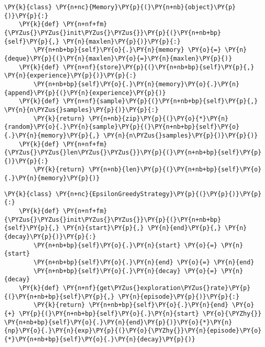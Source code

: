     \begin{tcolorbox}[breakable, size=fbox, boxrule=1pt, pad at break*=1mm,colback=cellbackground, colframe=cellborder]
\begin{Verbatim}[commandchars=\\\{\}]
\PY{k}{class} \PY{n+nc}{Memory}\PY{p}{(}\PY{n+nb}{object}\PY{p}{)}\PY{p}{:}
    \PY{k}{def} \PY{n+nf+fm}{\PYZus{}\PYZus{}init\PYZus{}\PYZus{}}\PY{p}{(}\PY{n+nb+bp}{self}\PY{p}{,} \PY{n}{maxlen}\PY{p}{)}\PY{p}{:}
        \PY{n+nb+bp}{self}\PY{o}{.}\PY{n}{memory} \PY{o}{=} \PY{n}{deque}\PY{p}{(}\PY{n}{maxlen}\PY{o}{=}\PY{n}{maxlen}\PY{p}{)}
    \PY{k}{def} \PY{n+nf}{store}\PY{p}{(}\PY{n+nb+bp}{self}\PY{p}{,} \PY{n}{experience}\PY{p}{)}\PY{p}{:}
        \PY{n+nb+bp}{self}\PY{o}{.}\PY{n}{memory}\PY{o}{.}\PY{n}{append}\PY{p}{(}\PY{n}{experience}\PY{p}{)}
    \PY{k}{def} \PY{n+nf}{sample}\PY{p}{(}\PY{n+nb+bp}{self}\PY{p}{,} \PY{n}{n\PYZus{}samples}\PY{p}{)}\PY{p}{:}
        \PY{k}{return} \PY{n+nb}{zip}\PY{p}{(}\PY{o}{*}\PY{n}{random}\PY{o}{.}\PY{n}{sample}\PY{p}{(}\PY{n+nb+bp}{self}\PY{o}{.}\PY{n}{memory}\PY{p}{,} \PY{n}{n\PYZus{}samples}\PY{p}{)}\PY{p}{)}
    \PY{k}{def} \PY{n+nf+fm}{\PYZus{}\PYZus{}len\PYZus{}\PYZus{}}\PY{p}{(}\PY{n+nb+bp}{self}\PY{p}{)}\PY{p}{:}
        \PY{k}{return} \PY{n+nb}{len}\PY{p}{(}\PY{n+nb+bp}{self}\PY{o}{.}\PY{n}{memory}\PY{p}{)}
\end{Verbatim}
\end{tcolorbox}

    \begin{tcolorbox}[breakable, size=fbox, boxrule=1pt, pad at break*=1mm,colback=cellbackground, colframe=cellborder]
\begin{Verbatim}[commandchars=\\\{\}]
\PY{k}{class} \PY{n+nc}{EpsilonGreedyStrategy}\PY{p}{(}\PY{p}{)}\PY{p}{:}
    \PY{k}{def} \PY{n+nf+fm}{\PYZus{}\PYZus{}init\PYZus{}\PYZus{}}\PY{p}{(}\PY{n+nb+bp}{self}\PY{p}{,} \PY{n}{start}\PY{p}{,} \PY{n}{end}\PY{p}{,} \PY{n}{decay}\PY{p}{)}\PY{p}{:}
        \PY{n+nb+bp}{self}\PY{o}{.}\PY{n}{start} \PY{o}{=} \PY{n}{start}
        \PY{n+nb+bp}{self}\PY{o}{.}\PY{n}{end} \PY{o}{=} \PY{n}{end}
        \PY{n+nb+bp}{self}\PY{o}{.}\PY{n}{decay} \PY{o}{=} \PY{n}{decay}
    \PY{k}{def} \PY{n+nf}{get\PYZus{}exploration\PYZus{}rate}\PY{p}{(}\PY{n+nb+bp}{self}\PY{p}{,} \PY{n}{episode}\PY{p}{)}\PY{p}{:}
        \PY{k}{return} \PY{n+nb+bp}{self}\PY{o}{.}\PY{n}{end} \PY{o}{+} \PY{p}{(}\PY{n+nb+bp}{self}\PY{o}{.}\PY{n}{start} \PY{o}{\PYZhy{}} \PY{n+nb+bp}{self}\PY{o}{.}\PY{n}{end}\PY{p}{)}\PY{o}{*}\PY{n}{np}\PY{o}{.}\PY{n}{exp}\PY{p}{(}\PY{o}{\PYZhy{}}\PY{n}{episode}\PY{o}{*}\PY{n+nb+bp}{self}\PY{o}{.}\PY{n}{decay}\PY{p}{)}
\end{Verbatim}
\end{tcolorbox}

